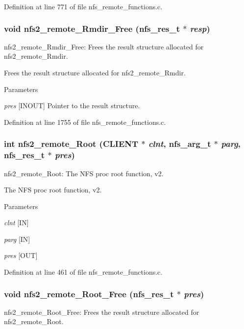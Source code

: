 Definition at line 771 of file nfs\_\-remote\_\-functions.c.
\subsubsection[{nfs2\_\-remote\_\-Rmdir\_\-Free}]{\setlength{\rightskip}{0pt plus 5cm}void nfs2\_\-remote\_\-Rmdir\_\-Free (nfs\_\-res\_\-t $\ast$ {\em resp})}\label{group__NFSprocs_ga53bbec2b1f42c5a367af2a27313af076}
nfs2\_\-remote\_\-Rmdir\_\-Free: Frees the result structure allocated for nfs2\_\-remote\_\-Rmdir.

Frees the result structure allocated for nfs2\_\-remote\_\-Rmdir.


\begin{DoxyParams}{Parameters}
\item[{\em pres}][INOUT] Pointer to the result structure. \end{DoxyParams}


Definition at line 1755 of file nfs\_\-remote\_\-functions.c.
\subsubsection[{nfs2\_\-remote\_\-Root}]{\setlength{\rightskip}{0pt plus 5cm}int nfs2\_\-remote\_\-Root (CLIENT $\ast$ {\em clnt}, \/  nfs\_\-arg\_\-t $\ast$ {\em parg}, \/  nfs\_\-res\_\-t $\ast$ {\em pres})}\label{group__NFSprocs_gac8e8c1f54e860453c2cb2102a5e6268b}
nfs2\_\-remote\_\-Root: The NFS proc root function, v2.

The NFS proc root function, v2.


\begin{DoxyParams}{Parameters}
\item[{\em clnt}][IN] \item[{\em parg}][IN] \item[{\em pres}][OUT] \end{DoxyParams}


Definition at line 461 of file nfs\_\-remote\_\-functions.c.
\subsubsection[{nfs2\_\-remote\_\-Root\_\-Free}]{\setlength{\rightskip}{0pt plus 5cm}void nfs2\_\-remote\_\-Root\_\-Free (nfs\_\-res\_\-t $\ast$ {\em pres})}\label{group__NFSprocs_gacc96856bb6de86d5c05e9c5e941248f3}
nfs2\_\-remote\_\-Root\_\-Free: Frees the result structure allocated for nfs2\_\-remote\_\-Root.

